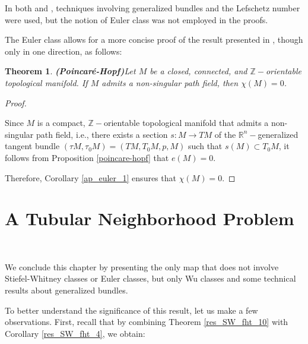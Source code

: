 \documentclass[12pt,oneside]{book}
\newtheorem{teo}    {Theorem}[chapter]
\newcommand{\R}{\mathbb{R}}
\newcommand{\Z}{\mathbb{Z}}
\begin{document}
    In both \cite{brown} and \cite{brown_2}, techniques involving generalized bundles and the Lefschetz 
    number were used, but the notion of Euler class was not employed in the proofs.

    The Euler class allows for a more concise proof of the result presented in \cite{brown}, though only in one direction, 
    as follows:

    \begin{teo}{\bf (Poincaré-Hopf)}\label{ap_euler_2}
    	Let $M$ be a closed, connected, and $\Z-$orientable topological manifold. If $M$ admits a non-singular 
        path field, then $\chi(M)=0$.
    \end{teo}

    \begin{proof}

        \

    	Since $M$ is a compact, $\Z-$orientable topological manifold that admits a non-singular path field, i.e., there exists a 
        section $s:M\to TM$ of the $\R^{n}-$generalized tangent bundle 
        $(\tau M,\tau_{0}M)=(TM,T_{0}M,p,M)$ such that $s(M)\subset T_{0}M$, it follows from Proposition \ref{poincare-hopf} that $e(M)=0$.

    	Therefore, Corollary \ref{ap_euler_1} ensures that $\chi(M)=0$.

    \end{proof}



    \section{A Tubular Neighborhood Problem}\label{sec_tubular}

    \

    We conclude this chapter by presenting the only map that does not involve Stiefel-Whitney classes or Euler 
    classes, but only Wu classes and some technical results about generalized 
    bundles.

    To better understand the significance of this result, let us make a few observations. First, recall that by combining Theorem 
    \ref{res_SW_fht_10} with Corollary \ref{res_SW_fht_4}, we obtain:
\end{document}
